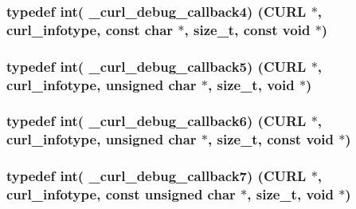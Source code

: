 \subsubsection[{\+\_\+curl\+\_\+debug\+\_\+callback4}]{\setlength{\rightskip}{0pt plus 5cm}typedef int( \+\_\+curl\+\_\+debug\+\_\+callback4) ({\bf C\+U\+R\+L} $\ast$, {\bf curl\+\_\+infotype}, const char $\ast$, size\+\_\+t, const void $\ast$)}\label{typecheck-gcc_8h_a8577cd6fbe76c09f0e0242d94f842651}
\hypertarget{typecheck-gcc_8h_a413cefc946d02050fd8ed446fb16d4af}{}
\subsubsection[{\+\_\+curl\+\_\+debug\+\_\+callback5}]{\setlength{\rightskip}{0pt plus 5cm}typedef int( \+\_\+curl\+\_\+debug\+\_\+callback5) ({\bf C\+U\+R\+L} $\ast$, {\bf curl\+\_\+infotype}, unsigned char $\ast$, size\+\_\+t, void $\ast$)}\label{typecheck-gcc_8h_a413cefc946d02050fd8ed446fb16d4af}
\hypertarget{typecheck-gcc_8h_a125129a4ee026e1ba2ea8bffc369e894}{}
\subsubsection[{\+\_\+curl\+\_\+debug\+\_\+callback6}]{\setlength{\rightskip}{0pt plus 5cm}typedef int( \+\_\+curl\+\_\+debug\+\_\+callback6) ({\bf C\+U\+R\+L} $\ast$, {\bf curl\+\_\+infotype}, unsigned char $\ast$, size\+\_\+t, const void $\ast$)}\label{typecheck-gcc_8h_a125129a4ee026e1ba2ea8bffc369e894}
\hypertarget{typecheck-gcc_8h_ae964409993dea78229a06595a232b8c6}{}
\subsubsection[{\+\_\+curl\+\_\+debug\+\_\+callback7}]{\setlength{\rightskip}{0pt plus 5cm}typedef int( \+\_\+curl\+\_\+debug\+\_\+callback7) ({\bf C\+U\+R\+L} $\ast$, {\bf curl\+\_\+infotype}, const unsigned char $\ast$, size\+\_\+t, void $\ast$)}\label{typecheck-gcc_8h_ae964409993dea78229a06595a232b8c6}
\hypertarget{typecheck-gcc_8h_a5c3caa775cdc5419a7934129fe16eae8}{}
